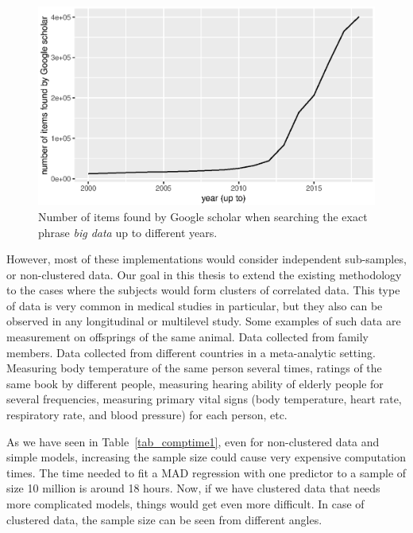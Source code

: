 \documentclass[11pt,a5paper,twoside]{book}
\begin{document}
\begin{figure}
\centering
\includegraphics[width=\textwidth]{bigdata.eps}
\caption{Number of items found by Google scholar when searching the exact phrase \emph{big data} up to different years.} 
\label{fig_bigdata}
\end{figure} 




However, most of these implementations would consider independent sub-samples, or non-clustered data. Our goal in this thesis to extend the existing methodology to the cases where the subjects would form clusters of correlated data. This type of data is very common in medical studies in particular, but they also can be observed in any longitudinal or multilevel study. Some examples of such data are measurement on offsprings of the same animal. Data collected from family members. Data collected from different countries in a meta-analytic setting. Measuring body temperature of the same person several times, ratings of the same book by different people, measuring hearing ability of elderly people for several frequencies, measuring primary vital signs (body temperature, heart rate, respiratory rate, and blood pressure) for each person, etc.

As we have seen in Table~\ref{tab_comptime1}, even for non-clustered data and simple models, increasing the sample size could cause very expensive computation times. The time needed to fit a MAD regression with one predictor to a sample of size 10 million is around 18 hours. Now, if we have clustered data that needs more complicated models, things would get even more difficult. In case of clustered data, the sample size can be seen from different angles. 
\end{document}
